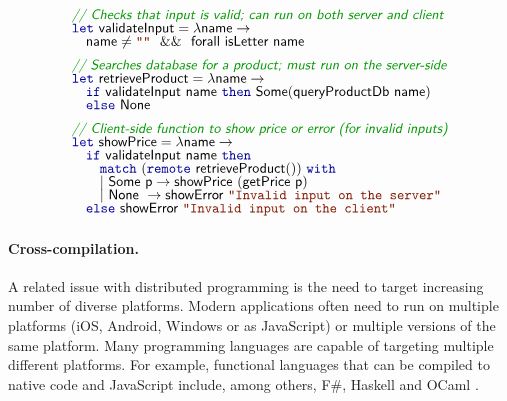 \begin{figure}
\begin{equation*}
\begin{array}{l}
\cmt{// Checks that input is valid; can run on both server and client}\\[-0.25em]
\kvd{let}~\ident{validateInput} = \lambda \ident{name} \rightarrow\\[-0.25em]
\quad\ident{name} \neq \str{} ~~\&\&~~ \ident{forall~isLetter~name}
\\[0.5em]
\cmt{// Searches database for a product; must run on the server-side}\\[-0.25em]
\kvd{let}~\ident{retrieveProduct} = \lambda \ident{name} \rightarrow\\[-0.25em]
\quad\kvd{if}~\ident{validateInput name}~\kvd{then}~\ident{Some}(\ident{queryProductDb~name})\\[-0.25em]
\quad\kvd{else}~\ident{None}
\\[0.5em]
\cmt{// Client-side function to show price or error (for invalid inputs)}\\[-0.25em]
\kvd{let}~\ident{showPrice} = \lambda \ident{name} \rightarrow\\[-0.25em]
\quad\kvd{if}~\ident{validateInput name}~\kvd{then}\\[-0.25em]
\quad\quad\kvd{match}~(\kvd{remote}~\ident{retrieveProduct}())~\kvd{with}\\[-0.25em]
\quad\quad|~\ident{Some}~\ident{p} \rightarrow \ident{showPrice}~(\ident{getPrice}~\ident{p})\\[-0.25em]
\quad\quad|~\ident{None}~\rightarrow \ident{showError}~\str{Invalid input on the server}\\[-0.25em]
\quad\kvd{else}~\ident{showError}~\str{Invalid input on the client}
\end{array}
\end{equation*}

\label{fig:applications-flat-distr}
\end{figure}


\paragraph{Cross-compilation.}
A related issue with distributed programming is the need to target increasing number of diverse
platforms. Modern applications often need to run on multiple platforms (iOS, Android, Windows or
as JavaScript) or multiple versions of the same platform. Many programming languages are capable
of targeting multiple different platforms. For example, functional languages that can be compiled 
to native code and JavaScript include, among others, F\#, Haskell and OCaml \cite{app-ocaml-js}.

